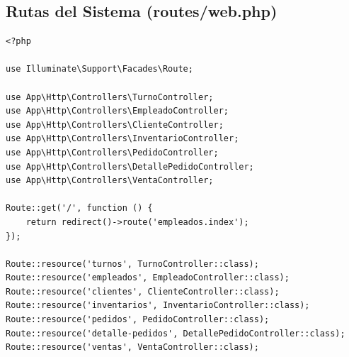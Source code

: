 \documentclass[12pt, letterpaper]{article}
\begin{document}
\subsection{Rutas del Sistema (routes/web.php)}
\begin{lstlisting}[language=purePHP]
<?php

use Illuminate\Support\Facades\Route;

use App\Http\Controllers\TurnoController;
use App\Http\Controllers\EmpleadoController;
use App\Http\Controllers\ClienteController;
use App\Http\Controllers\InventarioController;
use App\Http\Controllers\PedidoController;
use App\Http\Controllers\DetallePedidoController;
use App\Http\Controllers\VentaController;

Route::get('/', function () {
    return redirect()->route('empleados.index');
});

Route::resource('turnos', TurnoController::class);
Route::resource('empleados', EmpleadoController::class);
Route::resource('clientes', ClienteController::class);
Route::resource('inventarios', InventarioController::class);
Route::resource('pedidos', PedidoController::class);
Route::resource('detalle-pedidos', DetallePedidoController::class);
Route::resource('ventas', VentaController::class);
\end{lstlisting}
\end{document}
